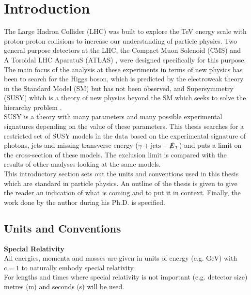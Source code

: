 \chapter{Introduction}

The Large Hadron Collider (LHC) \cite{lhc} was built to explore the TeV energy 
scale with proton-proton collisions to increase our understanding of particle 
physics. Two general purpose detectors at the LHC, the Compact Muon Solenoid 
(CMS) \cite{cms} and A Toroidal LHC AparatuS (ATLAS) \cite{atlas}, were designed 
specifically for this purpose. The main focus of the analysis at these 
experiments in terms of new physics has been to search for the Higgs boson, 
which is predicted by the electroweak theory in the Standard Model (SM)
\cite{higgs} but has not been observed, and Supersymmetry (SUSY) \cite{primer} 
which is a theory of new physics beyond the SM which seeks to solve the 
hierarchy problem \cite{dvali}. \\

SUSY is a theory with many parameters and many possible experimental signatures
depending on the value of these parameters. This thesis searches for a 
restricted set of SUSY models in the data based on the experimental signature of 
photons, jets and missing transverse energy ($\gamma + \mbox{jets} + \slashed{E}_{T}$) and 
puts a limit on the cross-section of these models. The exclusion limit is 
compared with the results of other analyses looking at the same models. \\ 

This introductory section sets out the units and conventions used in this thesis 
which are standard in particle physics. An outline of the thesis is given to 
give the reader an indication of what is coming and to put it in context.
Finally, the work done by the author during his Ph.D. is specified.

\section{Units and Conventions}

{\bf Special Relativity} \\

All energies, momenta and masses are given in units of energy (e.g. GeV) with
$c=1$ to naturally embody special relativity. \\

For lengths and times where special relativity is not important (e.g. detector
size) metres (m) and seconds (s) will be used. \\

